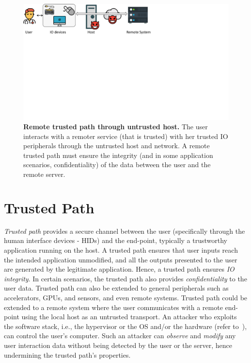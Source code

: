 \begin{figure}[t]
  \centering
    \includegraphics[trim={0 14cm 12cm 0},clip,width=\linewidth]{chapters/introduction/images/trustedPath.pdf}
    \caption[Remote trusted path through untrusted host]{\textbf{Remote trusted path through untrusted host.} The user interacts with a remoter service (that is trusted) with her trusted IO peripherals through the untrusted host and network. A remote trusted path must ensure the integrity (and in some application scenarios, confidentiality) of the data between the user and the remote server.}
    \label{fig:trustedPath}
\end{figure}

\section{Trusted Path}
\label{ch:intro:trustedPath}

\emph{Trusted path} provides a secure channel between the user (specifically through the human interface devices - HIDs) and the end-point, typically a trustworthy application running on the host. A trusted path ensures that user inputs reach the intended application unmodified, and all the outputs presented to the user are generated by the legitimate application. Hence, a trusted path ensures \emph{IO integrity}. In certain scenarios, the trusted path also provides \emph{confidentiality} to the user data. Trusted path can also be extended to general peripherals such as accelerators, GPUs, and sensors, and even remote systems. Trusted path could be extended to a remote system where the user communicates with a remote end-point using the local host as an untrusted transport. An attacker who exploits the software stack, i.e., the hypervisor or the OS and/or the hardware (refer to~), can control the user's computer. Such an attacker can \emph{observe} and \emph{modify} any user interaction data without being detected by the user or the server, hence undermining the trusted path's properties. 

